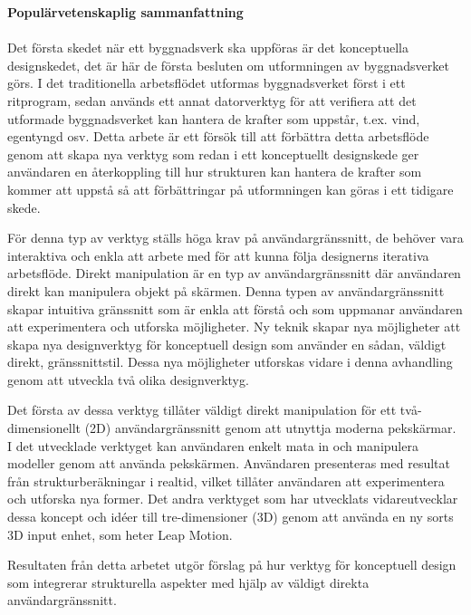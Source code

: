 \null\vfill

{\Huge \textbf{Populärvetenskaplig sammanfattning}} \\ \\

Det första skedet när ett byggnadsverk ska uppföras är det konceptuella designskedet, det är här de första besluten om utformningen av byggnadsverket görs. I det traditionella arbetsflödet utformas byggnadsverket först i ett ritprogram, sedan används ett annat datorverktyg för att verifiera att det utformade byggnadsverket kan hantera de krafter som uppstår, t.ex. vind, egentyngd osv. Detta arbete är ett försök till att förbättra detta arbetsflöde genom att skapa nya verktyg som redan i ett konceptuellt designskede ger användaren en återkoppling till hur strukturen kan hantera de krafter som kommer att uppstå så att förbättringar på utformningen kan göras i ett tidigare skede.

För denna typ av verktyg ställs höga krav på användargränssnitt, de behöver vara interaktiva och enkla att arbete med för att kunna följa designerns iterativa arbetsflöde. Direkt manipulation är en typ av användargränssnitt där användaren direkt kan manipulera objekt på skärmen. Denna typen av användargränssnitt skapar intuitiva gränssnitt som är enkla att förstå och som uppmanar användaren att experimentera och utforska möjligheter.  Ny teknik skapar nya möjligheter att skapa nya designverktyg för konceptuell design som använder en sådan, väldigt direkt, gränssnittstil. Dessa nya möjligheter utforskas vidare i denna avhandling genom att utveckla två olika designverktyg.

Det första av dessa verktyg tillåter väldigt direkt manipulation för ett två-dimensionellt (2D) användargränssnitt genom att utnyttja moderna pekskärmar. I det utvecklade verktyget kan användaren enkelt mata in och manipulera modeller genom att använda pekskärmen. Användaren presenteras med resultat från strukturberäkningar i realtid, vilket tillåter användaren att experimentera och utforska nya former. Det andra verktyget som har utvecklats vidareutvecklar dessa koncept och idéer till tre-dimensioner (3D) genom att använda en ny sorts 3D input enhet, som heter Leap Motion.

Resultaten från detta arbetet utgör förslag på hur verktyg för konceptuell design som integrerar strukturella aspekter med hjälp av väldigt direkta användargränssnitt.


\vfill\vfill\vfill\vfill\null